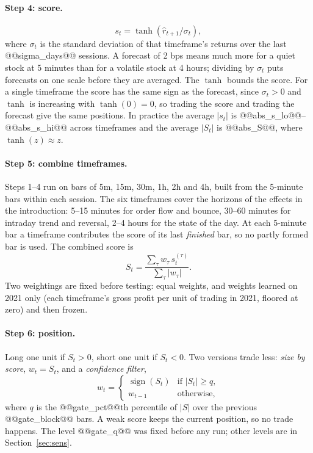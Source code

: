\documentclass[11pt,a4paper]{article}
\begin{document}
\paragraph{Step 4: score.}
\begin{equation}
s_t = \tanh(\hat r_{t+1}/\sigma_t),
\label{eq:score}
\end{equation}
where $\sigma_t$ is the standard deviation of that timeframe's returns over the last @@sigma_days@@
sessions. A forecast of 2 bps means much more for a quiet stock at 5 minutes than for a volatile stock at
4 hours; dividing by $\sigma_t$ puts forecasts on one scale before they are averaged. The $\tanh$ bounds
the score. For a single timeframe the score has the same sign as the forecast, since $\sigma_t>0$ and
$\tanh$ is increasing with $\tanh(0)=0$, so trading the score and trading the forecast give the same
positions. In practice the average $|s_t|$ is @@abs_s_lo@@--@@abs_s_hi@@ across timeframes and the average
$|S_t|$ is @@abs_S@@, where $\tanh(z)\approx z$.

\paragraph{Step 5: combine timeframes.} Steps 1--4 run on bars of 5m, 15m, 30m, 1h, 2h and 4h, built from
the 5-minute bars within each session. The six timeframes cover the horizons of the effects in the introduction:
5--15 minutes for order flow and bounce, 30--60 minutes for intraday trend and reversal, 2--4 hours for
the state of the day. At each 5-minute bar a timeframe contributes the score of its last \emph{finished}
bar, so no partly formed bar is used. The combined score is
\begin{equation}
S_t = \frac{\sum_\tau w_\tau\, s^{(\tau)}_t}{\sum_\tau |w_\tau|}.
\label{eq:mtf}
\end{equation}
Two weightings are fixed before testing: equal weights, and weights learned on 2021 only (each
timeframe's gross profit per unit of trading in 2021, floored at zero) and then frozen.

\paragraph{Step 6: position.} Long one unit if $S_t>0$, short one unit if $S_t<0$. Two versions trade less:
\emph{size by score}, $w_t=S_t$, and a \emph{confidence filter},
\[
w_t=\begin{cases}\operatorname{sign}(S_t) & \text{if } |S_t|\ge q,\\ w_{t-1} & \text{otherwise,}\end{cases}
\]
where $q$ is the @@gate_pct@@th percentile of $|S|$ over the previous @@gate_block@@ bars. A weak score keeps
the current position, so no trade happens. The level @@gate_q@@ was fixed before any run; other levels are
in Section~\ref{sec:sens}.
\end{document}
